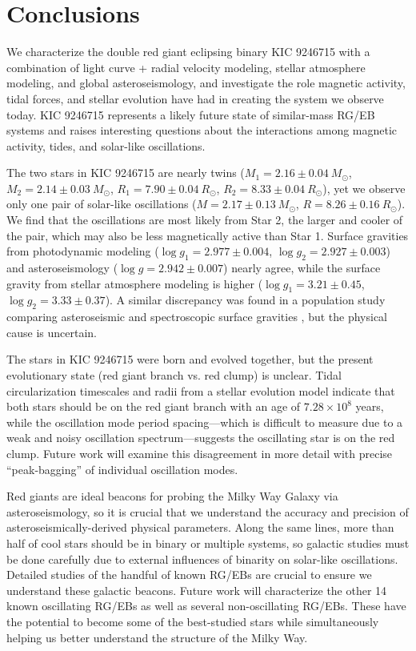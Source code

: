 \section{Conclusions}\label{conclude}
We characterize the double red giant eclipsing binary KIC 9246715 with a combination of light curve + radial velocity modeling, stellar atmosphere modeling, and global asteroseismology, and investigate the role magnetic activity, tidal forces, and stellar evolution have had in creating the system we observe today. KIC 9246715 represents a likely future state of similar-mass RG/EB systems and raises interesting questions about the interactions among magnetic activity, tides, and solar-like oscillations.

The two stars in KIC 9246715 are nearly twins ($M_1 = 2.16 \pm 0.04\ M_{\odot}$, $M_2 = 2.14 \pm 0.03\ M_{\odot}$, $R_1 = 7.90 \pm 0.04 \ R_{\odot}$, $R_2 = 8.33 \pm 0.04 \ R_{\odot}$), yet we observe only one pair of solar-like oscillations ($M = 2.17 \pm 0.13 \ M_{\odot}$, $R = 8.26 \pm 0.16 \ R_{\odot}$). We find that the oscillations are most likely from Star 2, the larger and cooler of the pair, which may also be less magnetically active than Star 1. Surface gravities from photodynamic modeling ($\log g_1 = 2.977 \pm 0.004$, $\log g_2 = 2.927 \pm 0.003$) and asteroseismology ($\log g = 2.942 \pm 0.007$) nearly agree, while the surface gravity from stellar atmosphere modeling is higher ($\log g_1 = 3.21 \pm 0.45$, $\log g_2 = 3.33 \pm 0.37$). A similar discrepancy was found in a population study comparing asteroseismic and spectroscopic surface gravities \citep{hol15}, but the physical cause is uncertain.

The stars in KIC 9246715 were born and evolved together, but the present evolutionary state (red giant branch vs. red clump) is unclear. Tidal circularization timescales and radii from a stellar evolution model indicate that both stars should be on the red giant branch with an age of $7.28 \times 10^8$ years, while the oscillation mode period spacing---which is difficult to measure due to a weak and noisy oscillation spectrum---suggests the oscillating star is on the red clump. Future work will examine this disagreement in more detail with precise ``peak-bagging'' of individual oscillation modes.

Red giants are ideal beacons for probing the Milky Way Galaxy via asteroseismology, so it is crucial that we understand the accuracy and precision of asteroseismically-derived physical parameters. Along the same lines, more than half of cool stars should be in binary or multiple systems, so galactic studies must be done carefully due to external influences of binarity on solar-like oscillations. Detailed studies of the handful of known RG/EBs are crucial to ensure we understand these galactic beacons. Future work will characterize the other 14 known oscillating RG/EBs as well as several non-oscillating RG/EBs. These have the potential to become some of the best-studied stars while simultaneously helping us better understand the structure of the Milky Way.
  
  
